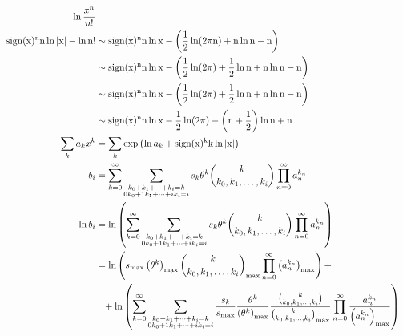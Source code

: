 \documentclass[10pt]{article}
\newcommand{\sign}{\ensuremath{\rm sign}}
\begin{document}
\begin{align*}\ln \frac{x^n}{n!} \\
\sign(x)^n n \ln |x| - \ln n! &\sim \sign(x)^n n \ln x - \left( \frac{1}{2}\ln(2 \pi n) + n \ln n - n \right) \\
  &\sim \sign(x)^n n \ln x - \left( \frac{1}{2}\ln(2 \pi) + \frac{1}{2}\ln n + n \ln n - n \right) \\
  &\sim \sign(x)^n n \ln x - \left( \frac{1}{2}\ln(2 \pi) + \frac{1}{2}\ln n + n \ln n - n \right) \\
  &\sim \sign(x)^n n \ln x - \frac{1}{2}\ln(2 \pi) - \left( n + \frac{1}{2} \right)\ln n + n \\
%
\sum_k a_k x^k &= \sum_k \exp\left( \ln a_k + \sign(x)^k k \ln |x| \right) \\
%
b_i &= \sum_{k=0}^{\infty} \sum_{\substack{k_0 + k_1 + \cdots + k_i = k \\ 0k_0 + 1k_1 + \cdots + i k_i = i}} s_k \theta^k \binom{k}{k_0, k_1, \ldots, k_i} \prod_{n=0}^{\infty} a_n^{k_n} \\
\ln b_i &= \ln\left( \sum_{k=0}^{\infty} \sum_{\substack{k_0 + k_1 + \cdots + k_i = k \\ 0k_0 + 1k_1 + \cdots + i k_i = i}} s_k \theta^k \binom{k}{k_0, k_1, \ldots, k_i} \prod_{n=0}^{\infty} a_n^{k_n} \right) \\
  &= \ln\left( s_{\rm max} \left( \theta^k \right)_{\rm max} \binom{k}{k_0, k_1, \ldots, k_i}_{\rm max} \prod_{n=0}^\infty \left( a_n^{k_n} \right)_{\rm max} \right) + \\
  &\phantom{=} + \ln\left( \sum_{k=0}^{\infty} \sum_{\substack{k_0 + k_1 + \cdots + k_i = k \\ 0k_0 + 1k_1 + \cdots + i k_i = i}} \frac{s_k}{s_{\rm max}} \frac{\theta^k}{\left( \theta^k \right)_{\rm max}} \frac{\binom{k}{k_0, k_1, \ldots, k_i}}{\binom{k}{k_0, k_1, \ldots, k_i}_{\rm max}} \prod_{n=0}^{\infty} \frac{a_n^{k_n}}{\left( a_n^{k_n} \right)_{\rm max}} \right)\end{align*}
\end{document}
